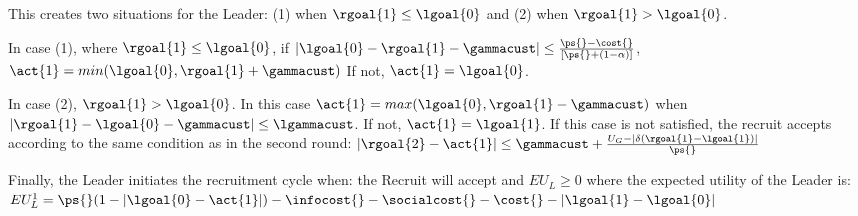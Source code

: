 This creates two situations for the Leader: (1) when $\rgoal{1}\leq \lgoal{0}$ and (2) when $\rgoal{1} > \lgoal{0}$.

In case (1), where $\rgoal{1} \leq \lgoal{0}$,  if $|\lgoal{0}- \rgoal{1} - \gammacust| \leq \frac{\ps{}- \cost{}}{[\ps{} + (1-\alpha)]}$, $\act{1} = min(\lgoal{0}, \rgoal{1} + \gammacust)$  If not, $\act{1} =\lgoal{0}$.

In case (2),  $\rgoal{1} > \lgoal{0}$. In this case $\act{1}= max(\lgoal{0}, \rgoal{1}- \gammacust)$ when $|\rgoal{1}- \lgoal{0} - \gammacust| \leq \lgammacust$. If not, $\act{1} =\lgoal{1}$. If this case is not satisfied, the recruit accepts according to the same condition as in the second round: $|\rgoal{2}- \act{1}| \leq \gammacust + \frac{U_{G} -|\delta(\rgoal{1}-\lgoal{1})|}{\ps{}}$

Finally, the Leader initiates the recruitment cycle when: the Recruit will accept and $EU_{L} \geq 0$ where the expected utility of the Leader is: $EU^{1}_{L}= \ps{}(1-|\lgoal{0}- \act{1}|) - \infocost{} -\socialcost{}- \cost{} -|\lgoal{1} - \lgoal{0}|$